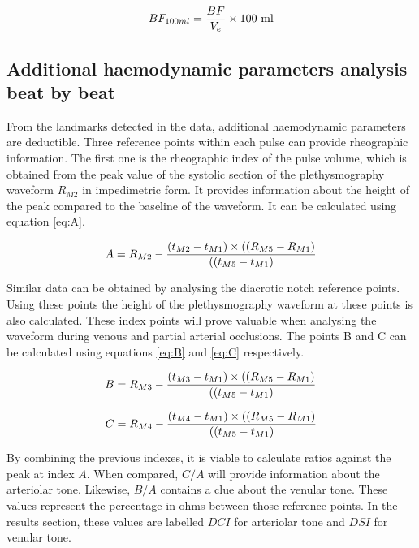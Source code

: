 \begin{align}
	\label{eq:bfpct}
	BF_{100ml} = \frac{BF}{V_e} \times \text{100 ml} \tagaddtext{[\si{\bfv}]}
\end{align}

\subsection{Additional haemodynamic parameters analysis beat by beat}
\label{section procedure 4.3}
From the landmarks  detected in the data, additional haemodynamic parameters are deductible. Three reference points within each pulse can provide rheographic information. The first one is the rheographic index of the pulse volume, which is obtained from the peak value of the systolic section of the plethysmography waveform $R_{M2}$ in impedimetric form. It provides information about the height of the peak compared to the baseline of the waveform. It can be calculated using equation \ref{eq:A}.

\begin{align}
	\label{eq:A}
	A = R_{M2} - \frac{(t_{M2}-t_{M1}) \times ((R_{M5}-R_{M1})}{((t_{M5}-t_{M1})} \tagaddtext{[\si{\ohm}]}
\end{align}

Similar data can be obtained by analysing the diacrotic notch reference points. Using these points the height of the plethysmography waveform at these points is also calculated. These index points will prove valuable when analysing the waveform during venous and partial arterial occlusions. The points B and C can be calculated using equations \ref{eq:B} and \ref{eq:C} respectively.  

\begin{align}
	\label{eq:B}
	B = R_{M3} - \frac{(t_{M3}-t_{M1}) \times ((R_{M5}-R_{M1})}{((t_{M5}-t_{M1})} \tagaddtext{[\si{\ohm}]}
\end{align}

\begin{align}
	\label{eq:C}
	C = R_{M4} - \frac{(t_{M4}-t_{M1}) \times ((R_{M5}-R_{M1})}{((t_{M5}-t_{M1})} \tagaddtext{[\si{\ohm}]}
\end{align}

By combining the previous indexes, it is viable to calculate ratios against the peak at index $A$. When compared,  $C/A$ will provide information about the arteriolar tone. Likewise, $B/A$ contains a clue about the venular tone. These values represent the percentage in ohms between those reference points. In the results section, these values are labelled $DCI$ for arteriolar tone and $DSI$ for venular tone.

